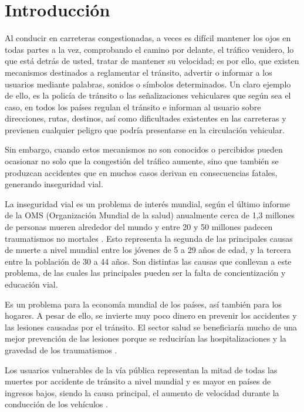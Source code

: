 \chapter{Introducción}
	\setcounter{page}{1}
	\renewcommand{\baselinestretch}{1} %
	Al conducir en carreteras congestionadas, a veces es difícil mantener los ojos en todas partes a la vez, comprobando el camino por delante, el tráfico venidero, lo que está detrás de usted, tratar de mantener su velocidad; es por ello, que existen mecanismos destinados a reglamentar el tránsito, advertir o informar a los usuarios mediante palabras, sonidos o símbolos determinados. Un claro ejemplo de ello, es la policía de tránsito o las señalizaciones vehiculares que según sea el caso, en todos los países regulan el tránsito e informan al usuario sobre direcciones, rutas, destinos, así como dificultades existentes en las carreteras y previenen cualquier peligro que podría presentarse en la circulación vehicular.

	\vskip 0.15cm
	Sin embargo, cuando estos mecanismos no son conocidos o percibidos pueden ocasionar no solo que la congestión del tráfico aumente, sino que también se produzcan accidentes que en muchos casos derivan en consecuencias fatales, generando inseguridad vial.

	\vskip 0.15cm
	La inseguridad vial es un problema de interés mundial, según el último informe de la OMS (Organización Mundial de la salud) anualmente cerca de 1,3 millones de personas mueren alrededor del mundo y entre 20 y 50 millones padecen traumatismos no mortales \citep{OMS}. Esto representa la segunda de las principales causas de muerte a nivel mundial entre los jóvenes de 5 a 29 años de edad, y la tercera entre la población de 30 a 44 años. Son distintas las causas que conllevan a este problema, de las cuales las principales pueden ser la falta de concientización y educación vial. 
	
	\vskip 0.15cm	
	Es un problema para la economía mundial de los países, así también para los hogares. A pesar de ello, se invierte muy poco dinero en prevenir los accidentes y las lesiones causadas por el tránsito. El sector salud se beneficiaría mucho de una mejor prevención de las lesiones porque se reducirían las hospitalizaciones y la gravedad de los traumatismos \citep{CNSV}.

	\vskip 0.15cm
	Los usuarios vulnerables de la vía pública representan la mitad de todas las muertes por accidente de tránsito a nivel mundial y es mayor en países de ingresos bajos, siendo la causa principal, el aumento de velocidad durante la conducción de los vehículos \citep{OMS}.


